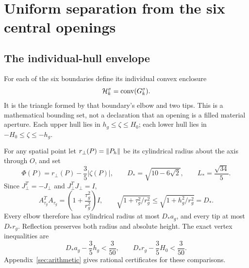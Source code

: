 \section{Uniform separation from the six central openings}\label{sec:separation}
\subsection{The individual-hull envelope}\label{sec:hulls}
For each of the six boundaries define its individual convex enclosure
\begin{equation}\label{eq:hulls}
 \mathcal H_k^\sigma=\operatorname{conv}(G_k^\sigma).
\end{equation}
It is the triangle formed by that boundary's elbow and two tips. This is a mathematical bounding set, not a declaration that an opening is a filled material aperture. Each upper hull lies in $h_g\le\zeta\le H_0$; each lower hull lies in $-H_0\le\zeta\le-h_g$.

For any spatial point let $r_\perp(P)=\left\lVert P_h\right\rVert$ be its cylindrical radius about the axis through $O$, and set
\begin{equation}\label{eq:separator}
 \Phi(P)=r_\perp(P)-\frac35|\zeta(P)|,\qquad
 D_* =\sqrt{10-6\sqrt2},\qquad L_* =\frac{\sqrt{34}}5.
\end{equation}
Since $J_\perp^T=-J_\perp$ and $J_\perp^TJ_\perp=I$,
\begin{equation}\label{eq:similarity}
 A_{\tau_g}^TA_{\tau_g}
 =\left(1+\frac{\tau_g^2}{r_g^2}\right)I,\qquad
 \sqrt{1+\tau_g^2/r_g^2}\le\sqrt{1+h_g^2/r_g^2}=D_*.
\end{equation}
Every elbow therefore has cylindrical radius at most $D_*a_g$, and every tip at most $D_*r_g$. Reflection preserves both radius and absolute height. The exact vertex inequalities are
\begin{equation}\label{eq:vertexbounds}
 D_*a_g-\frac35h_g<\frac3{50},\qquad
 D_*r_g-\frac35H_0<\frac3{50}.
\end{equation}
Appendix~\ref{sec:arithmetic} gives rational certificates for these comparisons.

